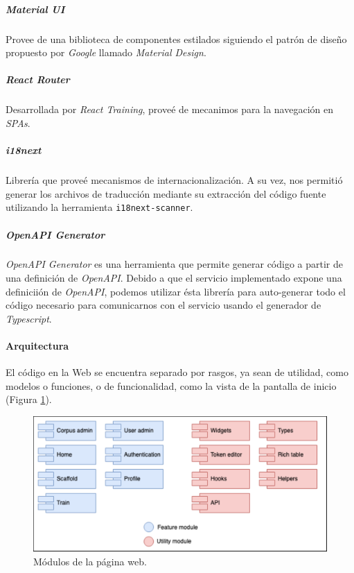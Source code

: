 \documentclass[12pt,a4paper,]{scrartcl}
\let\oldparagraph\paragraph
\renewcommand{\paragraph}[1]{\oldparagraph{#1}\mbox{}}
\let\oldsubparagraph\subparagraph
\renewcommand{\subparagraph}[1]{\oldsubparagraph{#1}\mbox{}}
\begin{document}
\hypertarget{material-ui}{%
\subparagraph{Material UI}\label{material-ui}}

Provee de una biblioteca de componentes estilados siguiendo el patrón de diseño propuesto por \emph{Google} llamado \emph{Material Design}.

\hypertarget{react-router}{%
\subparagraph{React Router}\label{react-router}}

Desarrollada por \emph{React Training}, proveé de mecanimos para la navegación en \emph{SPAs}.

\hypertarget{i18next}{%
\subparagraph{i18next}\label{i18next}}

Librería que proveé mecanismos de internacionalización. A su vez, nos permitió generar los archivos de traducción mediante su extracción del código fuente utilizando la herramienta \texttt{i18next-scanner}.

\hypertarget{openapi-generator}{%
\subparagraph{OpenAPI Generator}\label{openapi-generator}}

\emph{OpenAPI Generator} es una herramienta que permite generar código a partir de una definición de \emph{OpenAPI}.
Debido a que el servicio implementado expone una definiciión de \emph{OpenAPI}, podemos utilizar ésta librería para auto-generar todo el código necesario para comunicarnos con el servicio usando el generador de \emph{Typescript}.

\hypertarget{arquitectura}{%
\paragraph{Arquitectura}\label{arquitectura}}

El código en la Web se encuentra separado por rasgos, ya sean de utilidad, como modelos o funciones, o de funcionalidad, como la vista de la pantalla de inicio (Figura \ref{fig:developer-web-modules}).

\begin{figure}[H]

{\centering \includegraphics{assets/developer/web-modules.pdf} 

}

\caption{Módulos de la página web.}\label{fig:developer-web-modules}
\end{figure}
\end{document}
